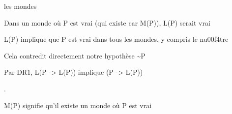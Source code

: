\documentclass[10pt]{report}
\begin{document}
\begin{coqdoccode}
\begin{coqdoccomment}
les\coqdocindent{0.50em}
mondes\coqdocindent{0.50em}
\end{coqdoccomment}
\coqdoceol
\coqdocindent{2.00em}
\begin{coqdoccomment}
\coqdocindent{0.50em}
Dans\coqdocindent{0.50em}
un\coqdocindent{0.50em}
monde\coqdocindent{0.50em}
où\coqdocindent{0.50em}
P\coqdocindent{0.50em}
est\coqdocindent{0.50em}
vrai\coqdocindent{0.50em}
(qui\coqdocindent{0.50em}
existe\coqdocindent{0.50em}
car\coqdocindent{0.50em}
M(P)),\coqdocindent{0.50em}
L(P)\coqdocindent{0.50em}
serait\coqdocindent{0.50em}
vrai\coqdocindent{0.50em}
\end{coqdoccomment}
\coqdoceol
\coqdocindent{2.00em}
\begin{coqdoccomment}
\coqdocindent{0.50em}
L(P)\coqdocindent{0.50em}
implique\coqdocindent{0.50em}
que\coqdocindent{0.50em}
P\coqdocindent{0.50em}
est\coqdocindent{0.50em}
vrai\coqdocindent{0.50em}
dans\coqdocindent{0.50em}
tous\coqdocindent{0.50em}
les\coqdocindent{0.50em}
mondes,\coqdocindent{0.50em}
y\coqdocindent{0.50em}
compris\coqdocindent{0.50em}
le\coqdocindent{0.50em}
nu00f4tre\coqdocindent{0.50em}
\end{coqdoccomment}
\coqdoceol
\coqdocindent{2.00em}
\begin{coqdoccomment}
\coqdocindent{0.50em}
Cela\coqdocindent{0.50em}
contredit\coqdocindent{0.50em}
directement\coqdocindent{0.50em}
notre\coqdocindent{0.50em}
hypothèse\coqdocindent{0.50em}
\~{}P\coqdocindent{0.50em}
\end{coqdoccomment}
\coqdoceol
\coqdocemptyline
\coqdocindent{2.00em}
\begin{coqdoccomment}
\coqdocindent{0.50em}
Par\coqdocindent{0.50em}
DR1,\coqdocindent{0.50em}
L(P\coqdocindent{0.50em}
->\coqdocindent{0.50em}
L(P))\coqdocindent{0.50em}
implique\coqdocindent{0.50em}
(P\coqdocindent{0.50em}
->\coqdocindent{0.50em}
L(P))\coqdocindent{0.50em}
\end{coqdoccomment}
\coqdoceol
\coqdocindent{2.00em}
   .\coqdoceol
\coqdocemptyline
\coqdocindent{2.00em}
\begin{coqdoccomment}
\coqdocindent{0.50em}
M(P)\coqdocindent{0.50em}
signifie\coqdocindent{0.50em}
qu'il\coqdocindent{0.50em}
existe\coqdocindent{0.50em}
un\coqdocindent{0.50em}
monde\coqdocindent{0.50em}
où\coqdocindent{0.50em}
P\coqdocindent{0.50em}
est\coqdocindent{0.50em}
vrai\coqdocindent{0.50em}
\end{coqdoccomment}
\coqdoceol
\coqdocindent{2.00em}
\begin{coqdoccomment}

\end{coqdoccomment}
\end{coqdoccode}
\end{document}

